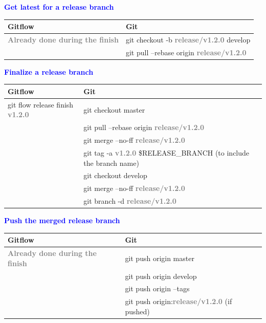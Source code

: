 \documentclass{tufte-handout}
\begin{document}
		\textbf{\textcolor{blue}{Get latest for a release branch}}
		
		\begin{table}[ht]
			\centering
			\selectfont
			\begin{tabular}{ll}
				Gitflow & Git \\
				\midrule
				\textbf{\textcolor{gray}{Already done during the finish}} & git checkout -b \textbf{\textcolor{gray}{release/v1.2.0}} develop \\
				& git pull --rebase origin \textbf{\textcolor{gray}{release/v1.2.0}} \\
			\end{tabular}
			\label{tab:normaltab}
		\end{table}
		\medskip %
		
	 	\clearpage

		\textbf{\textcolor{blue}{Finalize a release branch}}
		
		\begin{table}[ht]
			\centering
			\selectfont
			\begin{tabular}{ll}
				Gitflow & Git \\
				\midrule
				git flow release finish \textbf{\textcolor{gray}{v1.2.0}} & git checkout master \\
				& git pull --rebase origin \textbf{\textcolor{gray}{release/v1.2.0}} \\
				& git merge --no-ff \textbf{\textcolor{gray}{release/v1.2.0}} \\
				& git tag -a \textbf{\textcolor{gray}{v1.2.0}} \$RELEASE\_BRANCH (to include the branch name) \\
				& git checkout develop \\
				& git merge --no-ff \textbf{\textcolor{gray}{release/v1.2.0}} \\
				& git branch -d \textbf{\textcolor{gray}{release/v1.2.0}} \\ 
			\end{tabular}
			\label{tab:normaltab}
		\end{table}
		\medskip %
		

		\textbf{\textcolor{blue}{Push the merged release branch}}
		
		\begin{table}[ht]
			\centering
			\selectfont
			\begin{tabular}{ll}
				Gitflow & Git \\
				\midrule
				\textbf{\textcolor{gray}{Already done during the finish}} & git push origin master \\
				& git push origin develop \\
				& git push origin --tags \\
				& git push origin:\textbf{\textcolor{gray}{release/v1.2.0}} (if pushed) \\
			\end{tabular}
			\label{tab:normaltab}
		\end{table}
		\medskip %
		
\end{document}
